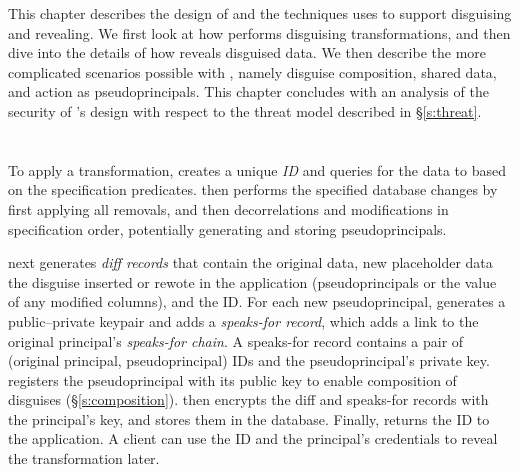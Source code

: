 This chapter describes the design of \sys and the techniques \sys uses to
support disguising and revealing. We first look at how \sys performs disguising
transformations, and then dive into the details of how \sys reveals disguised
data.
We then describe the more complicated scenarios possible with \sys, namely disguise composition, shared
data, and action as pseudoprincipals.
This chapter concludes with an analysis of the security of \sys's design with
respect to the threat model described in \S\ref{s:threat}.

\section{\Xxing}
\label{s:applying}

To apply a \xxing transformation, \sys creates a unique \emph{\xx ID} and
queries for the data to \xx based on the \xx specification predicates.
%
\sys then performs the specified database changes by first applying all
removals, and then decorrelations and modifications in specification order,
potentially generating and storing pseudoprincipals.
%
%

%
\sys next generates \emph{diff records} that contain \one{} the original data,
\two{} new placeholder data the disguise inserted or rewote in the application
(\eg pseudoprincipals or the value of any modified columns), and \three{} the
\xx ID.
%
For each new pseudoprincipal, \sys generates a public--private keypair and adds
a \emph{speaks-for record}, which adds a link to the original principal's
\emph{speaks-for chain}.
A speaks-for record contains a pair of (original principal,
pseudoprincipal) IDs and the pseudoprincipal’s
private key. \sys registers the pseudoprincipal with its public key to enable
composition of disguises (\S\ref{s:composition}).
%
\sys then encrypts the diff and speaks-for records with the principal's key,
and stores them in the database.
%
%
%
Finally, \sys returns the \xx ID to the application.
%
A client can use the \xx ID and the principal's
credentials to reveal the transformation later.
%

